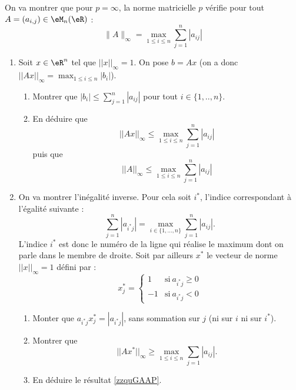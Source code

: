 \begin{exercice}[\coolexo]\label{exoGeomAnal-0041}

On va montrer que pour $p=\infty$, la norme matricielle $p$ vérifie pour tout $A=(a_{i,j})\in \eM_n(\eR)$ :
\begin{equation}    \label{zzquGAAP}
    \|A\|_{\infty}=\max_{1\le i\le n}\sum_{j=1}^n|a_{ij}|
\end{equation}

\begin{enumerate}
\item

Soit $x\in\eR^n$ tel que $||x||_{\infty}=1$. On pose $b=Ax$ (on a donc $||Ax||_{\infty}=\max_{1\le i\le n}|b_i|$).
\begin{enumerate}
\item Montrer que $|b_i|\le\sum_{j=1}^n|a_{ij}|$ pour tout $i\in\{1,..,n\}$.
\item En déduire que $$||Ax||_{\infty}\le\max_{1\le i\le n}\sum_{j=1}^n|a_{ij}|$$ puis que $$||A||_{\infty}\le\max_{1\le i\le n}\sum_{j=1}^n|a_{ij}|$$
\end{enumerate}

\item

On va montrer l'inégalité inverse. Pour cela soit $i^*$, l'indice correspondant à l'égalité suivante :
\begin{equation}
    \sum_{j=1}^n|a_{i^*j}|=\max_{i\in\{ 1,\ldots,n \}}\sum_{j=1}^n|a_{ij}|.
\end{equation}
L'indice \( i^*\) est donc le numéro de la ligne qui réalise le maximum dont on parle dans le membre de droite. Soit par ailleurs $x^*$ le vecteur de norme $||x||_{\infty}=1$ défini par : 
$$
x^*_j=\left\{
\begin{array}{ll}
	1 & \mbox{si}\ a_{i^*j}\ge 0 \\
	-1 & \mbox{si}\ a_{i^*j}< 0
\end{array}
\right.
$$
\begin{enumerate}
    \item
        Monter que \( a_{i^*j}x^*_j=| a_{i^*j} |\), sans sommation sur \( j\) (ni sur \( i\) ni sur \( i^*\)).
    \item Montrer que $$||Ax^*||_{\infty}\ge\max_{1\le i\le n}\sum_{j=1}|a_{ij}|.$$
\item En déduire le résultat \eqref{zzquGAAP}.
\end{enumerate} 

        
\end{enumerate}

\end{exercice}
